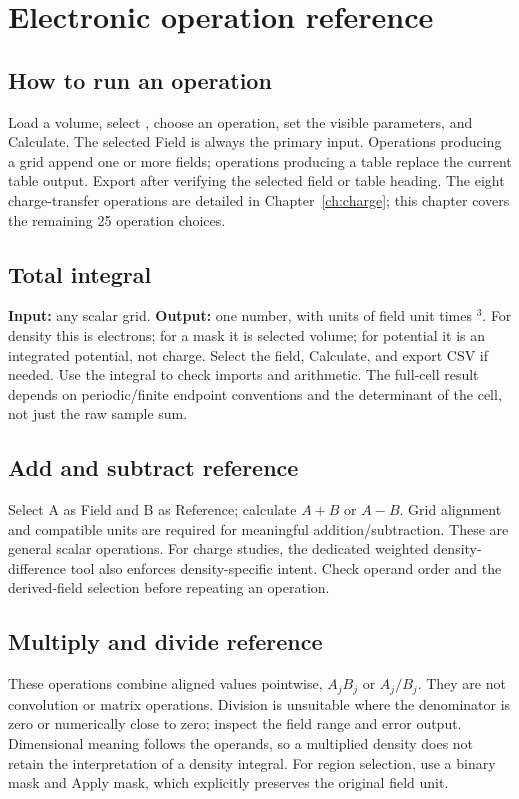 \chapter{Electronic operation reference}\label{ch:reference}
\section{How to run an operation}
Load a volume, select , choose an operation, set the visible parameters, and Calculate. The selected Field is always the primary input. Operations producing a grid append one or more fields; operations producing a table replace the current table output. Export after verifying the selected field or table heading. The eight charge-transfer operations are detailed in Chapter~\ref{ch:charge}; this chapter covers the remaining 25 operation choices.

\section{Total integral}
\textbf{Input:} any scalar grid. \textbf{Output:} one number, with units of field unit times \angstrom$^3$. For density this is electrons; for a mask it is selected volume; for potential it is an integrated potential, not charge. Select the field, Calculate, and export CSV if needed. Use the integral to check imports and arithmetic. The full-cell result depends on periodic/finite endpoint conventions and the determinant of the cell, not just the raw sample sum.

\section{Add and subtract reference}
Select A as Field and B as Reference; calculate $A+B$ or $A-B$. Grid alignment and compatible units are required for meaningful addition/subtraction. These are general scalar operations. For charge studies, the dedicated weighted density-difference tool also enforces density-specific intent. Check operand order and the derived-field selection before repeating an operation.

\section{Multiply and divide reference}
These operations combine aligned values pointwise, $A_jB_j$ or $A_j/B_j$. They are not convolution or matrix operations. Division is unsuitable where the denominator is zero or numerically close to zero; inspect the field range and error output. Dimensional meaning follows the operands, so a multiplied density does not retain the interpretation of a density integral. For region selection, use a binary mask and Apply mask, which explicitly preserves the original field unit.

